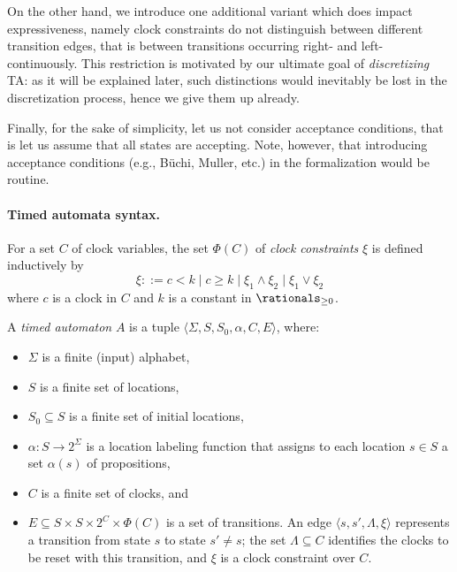 \documentclass[a4paper]{article}
\theoremstyle{plain}
\theoremstyle{definition}
\begin{document}
On the other hand, we introduce one additional variant which does impact expressiveness, namely clock constraints do not distinguish between different transition edges, that is between transitions occurring right- and left-continuously.
This restriction is motivated by our ultimate goal of \emph{discretizing} TA: as it will be explained later, such distinctions would inevitably be lost in the discretization process, hence we give them up already.

Finally, for the sake of simplicity, let us not consider acceptance conditions, that is let us assume that all states are accepting.
Note, however, that introducing acceptance conditions (e.g., B\"uchi, Muller, etc.) in the formalization would be routine.


\paragraph{Timed automata syntax.}

For a set $C$ of clock variables, the set $\Phi(C)$ of \emph{clock constraints} $\xi$ is defined inductively by
\begin{displaymath}
  \xi ::= c < k  \;|\; c \geq k \;|\; \xi_1 \wedge \xi_2 \;|\; \xi_1 \vee \xi_2
\end{displaymath}
where $c$ is a clock in $C$ and $k$ is a constant in $\rationals_{\geq 0}$.


A \emph{timed automaton} $A$ is a tuple $\langle \Sigma, S, S_0, \alpha, C, E \rangle$, where:
\begin{itemize}
\item $\Sigma$ is a finite (input) alphabet,
\item $S$ is a finite set of locations,
\item $S_0 \subseteq S$ is a finite set of initial locations,
\item $\alpha: S \rightarrow 2^\Sigma$ is a location labeling function that assigns to each location $s \in S$ a set $\alpha(s)$ of propositions,
\item $C$ is a finite set of clocks, and
\item $E \subseteq S \times S \times 2^{C} \times \Phi(C)$ is a set of transitions.
  An edge $\langle s, s', \Lambda, \xi \rangle$ represents a transition from state $s$ to state $s' \neq s$; the set $\Lambda \subseteq C$ identifies the clocks to be reset with this transition, and $\xi$ is a clock constraint over $C$.
\end{itemize}
\end{document}
